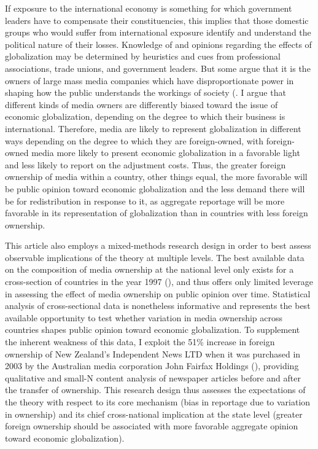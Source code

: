 \documentclass[12pt]{report}
\begin{document}
If exposure to the international economy is something for which government leaders have to
compensate their constituencies, this implies that those domestic groups who would suffer from international exposure identify and understand the political nature of their losses. Knowledge of and opinions regarding the effects of globalization may be determined by heuristics and cues from professional associations, trade unions, and
government leaders. But some argue that it is the owners of large mass media companies which have disproportionate power in shaping how the public understands the workings of society (\citealt{Baker:2006te,Bagdikian:1980ci,Ben:1990tw}. I argue that different kinds of media owners are differently biased toward the issue of economic globalization, depending on the degree to which their business is international. Therefore, media are likely to represent globalization in different ways depending on the degree to which they are foreign-owned, with foreign-owned media more likely to present economic globalization in a favorable light and less likely to report on the adjustment costs. Thus, the greater foreign ownership of media within a country, other things equal, the more favorable will be public opinion toward economic globalization and the less demand there will be for redistribution in response to it, as aggregate reportage will be more favorable in its representation of globalization than in countries with less foreign ownership.

This article also employs a mixed-methods research design in order to best assess observable implications of the theory at
multiple levels. The best available data on the composition of media ownership at the national level only exists for a cross-section of countries in the year 1997 (\citealt{Djankov:2001th}), and thus offers only limited leverage in assessing the effect of media ownership on public opinion over time. Statistical analysis of cross-sectional data is nonetheless informative and represents the best available opportunity to test whether variation in media ownership across countries shapes public opinion toward economic globalization. To supplement the inherent weakness of this data, I exploit the 51\% increase in foreign ownership of New Zealand's Independent News LTD when it was purchased in 2003 by the Australian media corporation John Fairfax Holdings (\citealt{Rosenberg:2008wu}), providing qualitative and small-N content analysis of newspaper articles before and after the transfer of ownership. This research design thus assesses the expectations of the theory with respect to its core mechanism (bias in reportage due to variation in ownership) and its chief cross-national implication at the state level (greater foreign ownership should be associated with more favorable aggregate opinion toward economic globalization).
\end{document}

